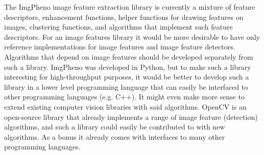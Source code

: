 \documentclass[twocolumn]{bmcart}
\begin{document}
The ImgPheno image feature extraction library is currently a mixture of feature descriptors, enhancement functions, helper functions for drawing features on images, clustering functions, and algorithms that implement such feature descriptors. For an image features library it would be more desirable to have only reference implementations for image features and image feature detectors. Algorithms that depend on image features should be developed separately from such a library. ImgPheno was developed in Python, but to make such a library interesting for high-throughput purposes, it would be better to develop such a library in a lower level programming language that can easily be interfaced to other programming languages (e.g. C++). It might even make more sense to extend existing computer vision libraries with said algorithms. OpenCV is an open-source library that already implements a range of image feature (detection) algorithms, and such a library could easily be contributed to with new algorithms. As a bonus it already comes with interfaces to many other programming languages.


\end{document}

